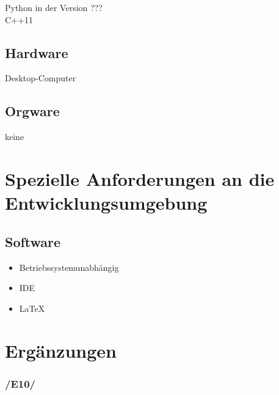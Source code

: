 \documentclass[10pt,a4paper]{article}
\begin{document}
	Python in der Version ??? \\
	C++11
	
	\subsection{Hardware}
	
	Desktop-Computer
	
	\subsection{Orgware}
	
	keine
	
	\section{Spezielle Anforderungen an die Entwicklungsumgebung}
	
	\subsection{Software}
	
		\begin{itemize}
			\item Betriebssystemunabhängig
			\item IDE
			\item \LaTeX
		\end{itemize}
	
	\section{Ergänzungen}
	
	\subsubsection*{/E10/}	
	
\end{document}
